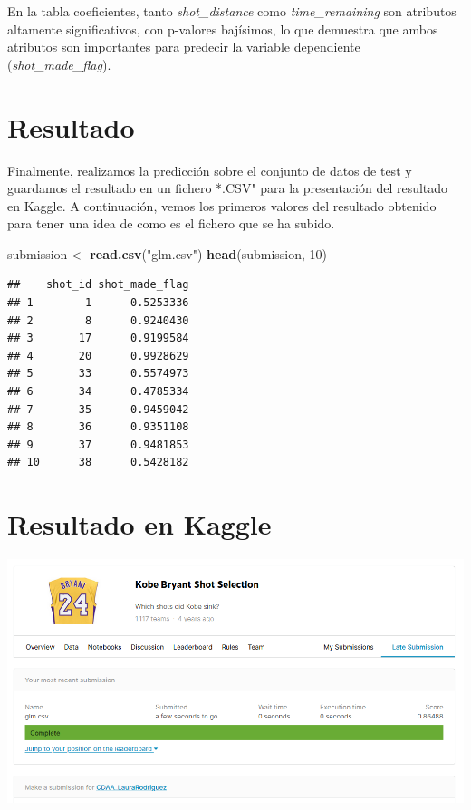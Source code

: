 \documentclass[
]{article}
\newenvironment{Shaded}{\begin{snugshade}}{\end{snugshade}}
\newcommand{\DecValTok}[1]{\textcolor[rgb]{0.00,0.00,0.81}{#1}}
\newcommand{\KeywordTok}[1]{\textcolor[rgb]{0.13,0.29,0.53}{\textbf{#1}}}
\newcommand{\NormalTok}[1]{#1}
\newcommand{\StringTok}[1]{\textcolor[rgb]{0.31,0.60,0.02}{#1}}
\begin{document}
En la tabla coeficientes, tanto \emph{shot\_distance} como
\emph{time\_remaining} son atributos altamente significativos, con
p-valores bajísimos, lo que demuestra que ambos atributos son
importantes para predecir la variable dependiente
(\emph{shot\_made\_flag}).

\hypertarget{resultado}{%
\section{\texorpdfstring{\textbf{Resultado}}{Resultado}}\label{resultado}}

Finalmente, realizamos la predicción sobre el conjunto de datos de test
y guardamos el resultado en un fichero *.CSV" para la presentación del
resultado en Kaggle. A continuación, vemos los primeros valores del
resultado obtenido para tener una idea de como es el fichero que se ha
subido.

\begin{Shaded}
\begin{Highlighting}[]
\NormalTok{submission <-}\StringTok{ }\KeywordTok{read.csv}\NormalTok{(}\StringTok{"glm.csv"}\NormalTok{)}
\KeywordTok{head}\NormalTok{(submission, }\DecValTok{10}\NormalTok{)}
\end{Highlighting}
\end{Shaded}

\begin{verbatim}
##    shot_id shot_made_flag
## 1        1      0.5253336
## 2        8      0.9240430
## 3       17      0.9199584
## 4       20      0.9928629
## 5       33      0.5574973
## 6       34      0.4785334
## 7       35      0.9459042
## 8       36      0.9351108
## 9       37      0.9481853
## 10      38      0.5428182
\end{verbatim}

\hypertarget{resultado-en-kaggle}{%
\section{\texorpdfstring{\textbf{Resultado en
Kaggle}}{Resultado en Kaggle}}\label{resultado-en-kaggle}}

\includegraphics{submission.png}
\end{document}
